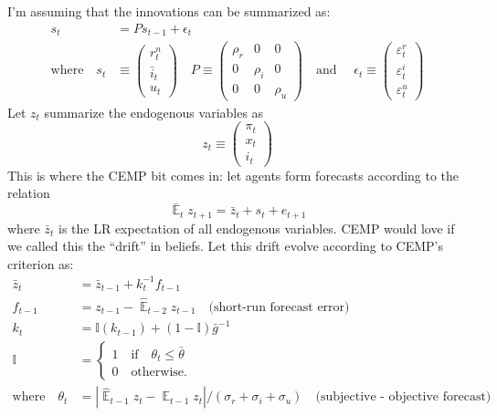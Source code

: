 \documentclass[11pt]{article}
\renewcommand{\[}{\begin{equation}}
\renewcommand{\]}{\end{equation}}
\DeclareMathOperator{\E}{\mathbb{E}}
\begin{document}
 I'm assuming that the innovations can be summarized as:
 \begin{align}
 s_t & = P s_{t-1} + \epsilon_t \\
 \text{where} \quad 
 s_t & \equiv \begin{pmatrix} r_t^n \\ \bar{i}_t \\ u_t 
 \end{pmatrix} \quad 
 P  \equiv \begin{pmatrix} \rho_r & 0 & 0 \\ 0& \rho_i & 0 \\ 0&0& \rho_u 
 \end{pmatrix}  \quad 
 \text{and } \quad 
 \epsilon_t \equiv \begin{pmatrix}\varepsilon_t^{r} \\ \varepsilon_t^{i}  \\ \varepsilon_t^{u} 
 \end{pmatrix} 
 \end{align}
 Let $z_t$ summarize the endogenous variables as
 \begin{equation}
 z_t \equiv \begin{pmatrix} \pi_t \\ x_t \\ i_t
 \end{pmatrix}
 \end{equation}
This is where the CEMP bit comes in: let agents form forecasts according to the relation
\begin{equation}
\bar{\E}_t z_{t+1} = \bar{z}_t + s_{t} + e_{t+1} \tag{PLM}
\end{equation}
where $\bar{z}_t$ is the LR expectation of all endogenous variables. CEMP would love if we called this the ``drift'' in beliefs. Let this drift evolve according to CEMP's criterion as:
\begin{align}
\bar{z}_t & = \bar{z}_{t-1} + k_t^{-1} f_{t-1} \\
f_{t-1} & = z_{t-1} - \hat{\E}_{t-2}z_{t-1} \quad \text{(short-run forecast error)} \\
k_t & = \mathbb{I}(k_{t-1}) + (1-\mathbb{I})\bar{g}^{-1} \\
\mathbb{I} &= \begin{cases} 1 \quad \text{if} \quad \theta_t \leq \bar{\theta} \\
0 \quad \text{otherwise.}
\end{cases} \\
\text{where} \quad \theta_t & = |\hat{\E}_{t-1}z_t - \E_{t-1}z_t  | / (\sigma_r + \sigma_i + \sigma_u) \quad \text{(subjective - objective forecast)}
\end{align}
\end{document}
